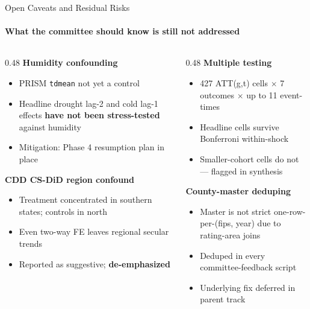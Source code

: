 \documentclass[aspectratio=169,11pt]{beamer}
\newcommand{\emphcolor}[1]{{\color{WarmOrange}\textbf{#1}}}
\newcommand{\tealtext}[1]{{\color{Teal}#1}}
\begin{document}
\begin{frame}{Open Caveats and Residual Risks}
  \framesubtitle{What the committee should know is still not addressed}
  \begin{columns}[T]
    \begin{column}{0.48\textwidth}
      \textbf{\tealtext{Humidity confounding}}
      \begin{itemize}\itemsep0.15em
        \item PRISM \texttt{tdmean} not yet a control
        \item Headline drought lag-2 and cold lag-1 effects \emphcolor{have not been stress-tested} against humidity
        \item Mitigation: Phase 4 resumption plan in place
      \end{itemize}
      \vspace{0.4em}
      \textbf{\tealtext{CDD CS-DiD region confound}}
      \begin{itemize}\itemsep0.15em
        \item Treatment concentrated in southern states; controls in north
        \item Even two-way FE leaves regional secular trends
        \item Reported as suggestive; \emphcolor{de-emphasized}
      \end{itemize}
    \end{column}
    \begin{column}{0.48\textwidth}
      \textbf{\tealtext{Multiple testing}}
      \begin{itemize}\itemsep0.15em
        \item 427 ATT(g,t) cells \(\times\) 7 outcomes \(\times\) up to 11 event-times
        \item Headline cells survive Bonferroni within-shock
        \item Smaller-cohort cells do not --- flagged in synthesis
      \end{itemize}
      \vspace{0.4em}
      \textbf{\tealtext{County-master deduping}}
      \begin{itemize}\itemsep0.15em
        \item Master is not strict one-row-per-(fips, year) due to rating-area joins
        \item Deduped in every committee-feedback script
        \item Underlying fix deferred in parent track
      \end{itemize}
    \end{column}
  \end{columns}
\end{frame}
\end{document}
